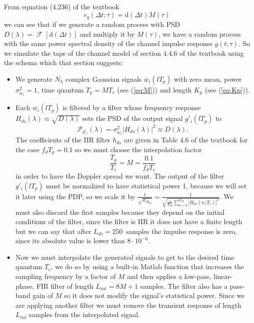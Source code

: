 \documentclass[a4paper,oneside]{article}
\newcommand{\abs}[1]{\left|#1\right|}
\newcommand{\F}[1]{\operatorname{\mathcal{F}}\left[#1\right]}
\begin{document}
From equation (4.236) of the textbook
\[ r_g(\Delta t;\tau) = \mathrm{d}(\Delta t)M(\tau) \]
we can see that if we generate a random process with PSD $D(\lambda) =
\F{\mathrm{d}(\Delta t)}$ and multiply it by $M(\tau)$, we have a
random process with the same power spectral density of the channel
impulse response $g(t;\tau)$. So we simulate the taps of the channel
model of section 4.4.6 of the textbook using the schema which that
section suggests:
\begin{itemize}
  \item We generate $N_h$ complex Gaussian signals
    $\overline{w}_i(lT_p)$ with zero mean, power
    $\sigma^2_{\overline{w}_i} = 1$, time quantum $T_p = MT_c$ (see
    (\ref{eq:M})) and length $K_p$ (see (\ref{eq:Kp})).
  \item Each $\overline{w}_i(lT_p)$ is filtered by a filter whose
    frequency response $ H_{ds}(\lambda) \approx \sqrt{D(\lambda)} $
    sets the PSD of the output signal $g'_i(lT_p)$ to
    \[ \mathcal{P}_{g'_i}(\lambda) = \sigma^2_{\overline{w}_i} \abs{H_{ds}(\lambda)}^2 \approx D(\lambda) . \]
    The coefficients of the IIR filter $h_{ds}$ are given in Table 4.6
    of the textbook for the case $f_dT_p = 0.1$ so we must choose the
    interpolation factor
    \begin{equation}
      \frac{T_p}{T_c} = M = \frac{0.1}{f_dT_c}
      \label{eq:M}
    \end{equation}
    in order to have the Doppler spread we want. The output of the
    filter $g'_i(lT_p)$ must be normalized to have statistical power 1,
    because we will set it later using the PDP, so we scale it by $
    \frac{1}{\sqrt{E_{H_{ds}}}} =
    \frac{1}{\sqrt{\frac{1}{K_H}\sum_{n=0}^{K_H}
        \abs{H_{ds}(n/T_c)}^2}} $. We must also discard the first
    samples because they depend on the initial conditions of the
    filter, since the filter is IIR it does not have a finite length
    but we can say that after $L_{ds} = 250$~samples the impulse
    response is zero, since its absolute value is lower than
    $8\cdot10^{-6}$.
    \item Now we must interpolate the generated signals to get to the
      desired time quantum $T_c$, we do so by using a built-in Matlab
      function that increases the sampling frequency by a factor of
      $M$ and then applies a low-pass, linear-phase, FIR filter of
      length $L_{int} = 8M+1$ samples. The filter also has a pass-band
      gain of $M$ so it does not modify the signal's statistical
      power. Since we are applying another filter we must remove the
      transient response of length $L_{int}$ samples from the
      interpolated signal.


\end{itemize}
\end{document}
